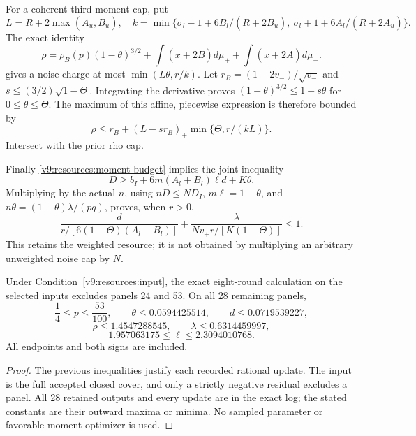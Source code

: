 For a coherent third-moment cap, put
\[
 L=R+2\max(\bar A_u,\bar B_u),\quad
 k=\min\{\sigma_l-1+6B_l/(R+2\bar B_u),\
          \sigma_l+1+6A_l/(R+2\bar A_u)\}.
\]
The exact identity
\[\rho=\rho_B(p)(1-\theta)^{3/2}+\int(x+2\bar B)d\mu_++\int(x+2\bar A)d\mu_-.\]
gives a noise charge at most \(\min(L\theta,r/k)\).
Let \(r_B=(1-2v_-)/\sqrt{v_-}\) and
\(s\le(3/2)\sqrt{1-\Theta}\). Integrating the derivative proves
\((1-\theta)^{3/2}\le1-s\theta\) for \(0\le\theta\le\Theta\).
The maximum of this affine, piecewise expression is therefore bounded by
\[
 \rho\le r_B+(L-sr_B)_+\min\{\Theta,r/(kL)\}.
\]
Intersect with the prior rho cap.

Finally \eqref{v9:resources:moment-budget} implies the joint inequality
\[
 D\ge b_I+6m(A_l+B_l)\ell d+K\theta.
\]
Multiplying by the actual \(n\), using \(nD\le ND_I\),
\(m\ell=1-\theta\), and \(n\theta=(1-\theta)\lambda/(pq)\),
proves, when \(r>0\),
\[
 \frac{d}{r/[6(1-\Theta)(A_l+B_l)]}
 +\frac{\lambda}{Nv_+r/[K(1-\Theta)]}\le1.
\]
This retains the weighted resource; it is not obtained by multiplying an
arbitrary unweighted noise cap by \(N\).

\begin{theorem}\label{v9:resources:all-panels}
Under Condition~\ref{v9:resources:input}, the exact eight-round
calculation on the selected inputs excludes panels 24 and 53.
On all 28 remaining panels,
\[
 \frac14\le p\le\frac{53}{100},\qquad
 \theta\le0.0594425514,\qquad d\le0.0719539227,
\]
\[
 \rho\le1.4547288545,\qquad \lambda\le0.6314459997,
\]
\[
 1.957063175\le\ell\le2.3094010768.
\]
All endpoints and both signs are included.
\end{theorem}
\begin{proof}
The previous inequalities justify each recorded rational update.
The input is the full accepted closed cover, and only a strictly negative
residual excludes a panel. All 28 retained outputs and every update are in
the exact log; the stated constants are their outward maxima or minima.
No sampled parameter or favorable moment optimizer is used.
\end{proof}


